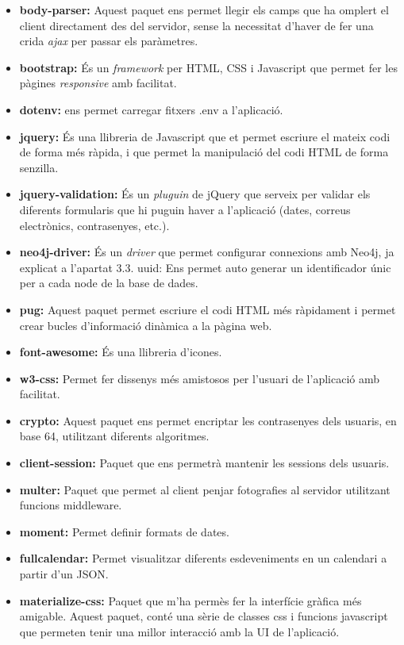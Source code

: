 \documentclass[11pt,catalan,listoffigures,listoftables]{tfgetsinf}
\begin{document}
\begin{itemize}
\item \textbf{body-parser:} Aquest paquet ens permet llegir els camps que ha omplert el client directament des del servidor, sense la necessitat d'haver de fer una crida \textit{ajax} per passar els paràmetres.
\item \textbf{bootstrap:} És un \textit{framework} per HTML, CSS i Javascript que permet fer les pàgines \textit{responsive} amb facilitat.
\item \textbf{dotenv:} ens permet carregar fitxers .env a l'aplicació.
\item \textbf{jquery:} És una llibreria de Javascript que et permet escriure el mateix codi de forma més ràpida, i que permet la manipulació del codi HTML de forma senzilla.
\item \textbf{jquery-validation:} És un \textit{pluguin} de jQuery que serveix per validar els diferents formularis que hi puguin haver a l'aplicació (dates, correus electrònics, contrasenyes, etc.).
\item \textbf{neo4j-driver:} És un \textit{driver} que permet configurar connexions amb Neo4j, ja explicat a l'apartat 3.3.
uuid: Ens permet auto generar un identificador únic per a cada node de la base de dades.
\item \textbf{pug:} Aquest paquet permet escriure el codi HTML més ràpidament i permet crear bucles d'informació dinàmica a la pàgina web.
\item \textbf{font-awesome:} És una llibreria d'icones.
\item \textbf{w3-css:} Permet fer dissenys més amistosos per l'usuari de l'aplicació amb facilitat.
\item \textbf{crypto:} Aquest paquet ens permet encriptar les contrasenyes dels usuaris, en base 64, utilitzant diferents algoritmes.
\item \textbf{client-session:} Paquet que ens permetrà mantenir les sessions dels usuaris.
\item \textbf{multer:} Paquet que permet al client penjar fotografies al servidor utilitzant funcions middleware.
\item \textbf{moment:} Permet definir formats de dates.
\item \textbf{fullcalendar:} Permet visualitzar diferents esdeveniments en un calendari a partir d'un JSON.
\item \textbf{materialize-css:} Paquet que m'ha permès fer la interfície gràfica més amigable. Aquest paquet, conté una sèrie de classes css i funcions javascript que permeten tenir una millor interacció amb la UI de l'aplicació.

\end{itemize}
\end{document}
